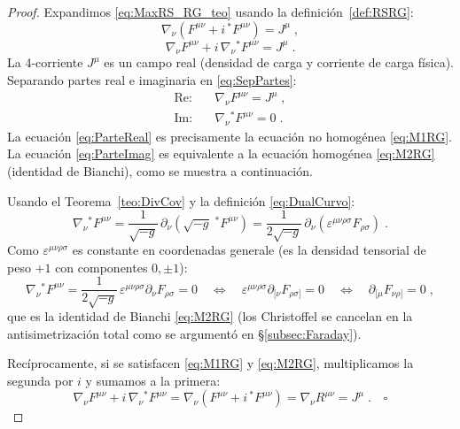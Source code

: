             \begin{proof}
                Expandimos \eqref{eq:MaxRS_RG_teo} usando la definición~\ref{def:RSRG}:
                \begin{equation*}
                    \nabla_{\nu}(F^{\mu\nu} + i\,{}^{*}F^{\mu\nu}) = J^{\mu}\;,
                \end{equation*}
                \begin{equation}\label{eq:SepPartes}
                    \nabla_{\nu}F^{\mu\nu} + i\,\nabla_{\nu}{}^{*}F^{\mu\nu} = J^{\mu}\;.
                \end{equation}
                La 4-corriente $J^{\mu}$ es un campo real (densidad de carga y corriente de carga física).  Separando partes real e imaginaria en
                \eqref{eq:SepPartes}:
                \begin{align}
                    \text{Re:}\quad &\nabla_{\nu}F^{\mu\nu} = J^{\mu}\;, \label{eq:ParteReal}\\
                    \text{Im:}\quad &\nabla_{\nu}{}^{*}F^{\mu\nu} = 0\;.\label{eq:ParteImag}
                \end{align}
                La ecuación \eqref{eq:ParteReal} es precisamente la ecuación no homogénea \eqref{eq:M1RG}.  La ecuación \eqref{eq:ParteImag} es equivalente a la ecuación homogénea \eqref{eq:M2RG} (identidad de Bianchi), como se muestra a continuación.

                Usando el Teorema~\ref{teo:DivCov} y la definición \eqref{eq:DualCurvo}:
                \begin{equation*}
                    \nabla_{\nu}{}^{*}F^{\mu\nu} = \frac{1}{\sqrt{-g}}\,\partial_{\nu}\!\left(\sqrt{-g}\;{}^{*}F^{\mu\nu}\right) = \frac{1}{2\sqrt{-g}}\,\partial_{\nu}\!\left(\varepsilon^{\mu\nu\rho\sigma} F_{\rho\sigma}\right)\;.
                \end{equation*}
                Como $\varepsilon^{\mu\nu\rho\sigma}$ es constante en coordenadas generale (es la densidad tensorial de peso $+1$ con componentes $0,\pm1$):
                \begin{equation*}
                    \nabla_{\nu}{}^{*}F^{\mu\nu} = \frac{1}{2\sqrt{-g}}\,\varepsilon^{\mu\nu\rho\sigma} \partial_{\nu}F_{\rho\sigma} = 0 \quad\Longleftrightarrow\quad \varepsilon^{\mu\nu\rho\sigma}\partial_{[\nu}F_{\rho\sigma]} = 0 \quad\Longleftrightarrow\quad \partial_{[\mu}F_{\nu\rho]} = 0\;,
                \end{equation*}
                que es la identidad de Bianchi \eqref{eq:M2RG} (los Christoffel se cancelan en la antisimetrización total como se argumentó en \S\ref{subsec:Faraday}).

                Recíprocamente, si se satisfacen \eqref{eq:M1RG} y \eqref{eq:M2RG}, multiplicamos la segunda por $i$ y sumamos a la primera:
                \begin{equation*}
                    \nabla_{\nu}F^{\mu\nu}+i\,\nabla_{\nu}{}^{*}F^{\mu\nu} = \nabla_{\nu}(F^{\mu\nu}+i\,{}^{*}F^{\mu\nu}) = \nabla_{\nu}R^{\mu\nu} = J^{\mu}\;.\quad\square
                \end{equation*}
            \end{proof}

